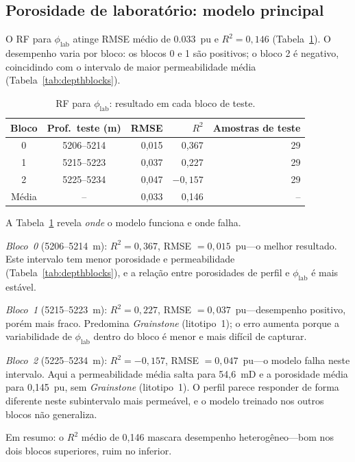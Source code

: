 \documentclass[11pt,a4paper]{article}
\newcommand{\philab}{\ensuremath{\phi_{\mathrm{lab}}}}
\begin{document}
\subsection{Porosidade de laboratório: modelo principal}

O RF para \philab{} atinge RMSE médio de \SI{0.033}{pu} e
$R^2 = 0{,}146$ (Tabela~\ref{tab:phi_folds}).
O desempenho varia por bloco: os blocos 0 e 1 são positivos; o bloco 2
é negativo, coincidindo com o intervalo de maior permeabilidade média
(Tabela~\ref{tab:depthblocks}).

\begin{table}[H]
  \centering
  \caption{RF para \philab{}: resultado em cada bloco de teste.}
  \label{tab:phi_folds}
  \begin{tabular}{ccrrr}
    \toprule
    Bloco & Prof.\ teste (m) & RMSE & $R^2$ & Amostras de teste \\
    \midrule
    0 & 5206--5214 & 0,015 & 0,367 & 29 \\
    1 & 5215--5223 & 0,037 & 0,227 & 29 \\
    2 & 5225--5234 & 0,047 & $-0{,}157$ & 29 \\
    \midrule
    Média & -- & 0,033 & 0,146 & -- \\
    \bottomrule
  \end{tabular}
\end{table}

A Tabela~\ref{tab:phi_folds} revela \emph{onde} o modelo funciona e onde falha.

\emph{Bloco~0} (5206--5214~m): $R^2 = 0{,}367$, RMSE $= 0{,}015$~pu---o
melhor resultado.
Este intervalo tem menor porosidade e permeabilidade
(Tabela~\ref{tab:depthblocks}), e a relação entre porosidades de perfil
e \philab{} é mais estável.

\emph{Bloco~1} (5215--5223~m): $R^2 = 0{,}227$, RMSE $= 0{,}037$~pu---desempenho
positivo, porém mais fraco.
Predomina \emph{Grainstone} (litotipo~1); o erro aumenta porque a variabilidade de
\philab{} dentro do bloco é menor e mais difícil de capturar.

\emph{Bloco~2} (5225--5234~m): $R^2 = -0{,}157$, RMSE $= 0{,}047$~pu---o modelo
falha neste intervalo.
Aqui a permeabilidade média salta para 54,6~mD e a porosidade média para
0,145~pu, sem \emph{Grainstone} (litotipo~1).
O perfil parece responder de forma diferente neste subintervalo mais
permeável, e o modelo treinado nos outros blocos não generaliza.

Em resumo: o $R^2$ médio de 0,146 mascara desempenho heterogêneo---bom nos
dois blocos superiores, ruim no inferior.
\end{document}
